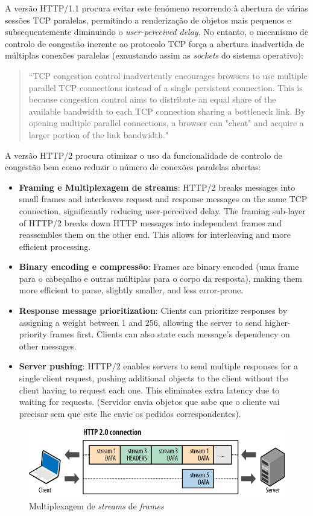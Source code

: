 \noindent A versão HTTP/1.1 procura evitar este fenómeno recorrendo à abertura de várias sessões TCP paralelas, permitindo a renderização de objetos mais pequenos e subsequentemente diminuindo o \textit{user-perceived delay}. No entanto, o mecanismo de controlo de congestão inerente ao protocolo TCP força a abertura inadvertida de múltiplas conexões paralelas (exaustando assim as \textit{sockets} do sistema operativo):

\begin{quote}
     ``TCP congestion control inadvertently encourages browsers to use multiple parallel TCP connections instead of a single persistent connection. This is because congestion control aims to distribute an equal share of the available bandwidth to each TCP connection sharing a bottleneck link. By opening multiple parallel connections, a browser can "cheat" and acquire a larger portion of the link bandwidth."\cite{Kurose2017}
\end{quote}

\noindent A versão HTTP/2 procura otimizar o uso da funcionalidade de controlo de congestão bem como reduzir o número de conexões paralelas abertas:

\begin{itemize}
  \item \textbf{Framing e Multiplexagem de streams}: HTTP/2 breaks messages into small frames and interleaves request and response messages on the same TCP connection, significantly reducing user-perceived delay.
  The framing sub-layer of HTTP/2 breaks down HTTP messages into independent frames and reassembles them on the other end. This allows for interleaving and more efficient processing.
  
  \item \textbf{Binary encoding e compressão}: Frames are binary encoded (uma frame para o cabeçalho e outras múltiplas para o corpo da resposta), making them more efficient to parse, slightly smaller, and less error-prone.
  
  \item \textbf{Response message prioritization}: Clients can prioritize responses by assigning a weight between 1 and 256, allowing the server to send higher-priority frames first. Clients can also state each message's dependency on other messages.
  
  \item \textbf{Server pushing}: HTTP/2 enables servers to send multiple responses for a single client request, pushing additional objects to the client without the client having to request each one. This eliminates extra latency due to waiting for requests. (Servidor envia objetos que sabe que o cliente vai precisar sem que este lhe envie os pedidos correspondentes).
\end{itemize}

\begin{figure}[H]
    \centering
    \includegraphics[width = 0.9\linewidth]{img/2/HTTP2.png}
    \caption{Multiplexagem de \textit{streams} de \textit{frames}}
    \label{fig:http2}
\end{figure}